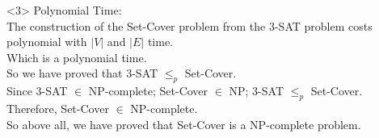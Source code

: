 <3> Polynomial Time:\\
The construction of the Set-Cover problem from the 3-SAT problem costs polynomial with $|V|$ and $|E|$ time.\\
Which is a polynomial time.\\

So we have proved that 3-SAT $\leq_p$ Set-Cover.\\

Since 3-SAT $\in$ NP-complete; Set-Cover $\in$ NP; 3-SAT $\leq_p$ Set-Cover.\\
Therefore, Set-Cover $\in$ NP-complete.\\

So above all, we have proved that Set-Cover is a NP-complete problem.

\newpage
